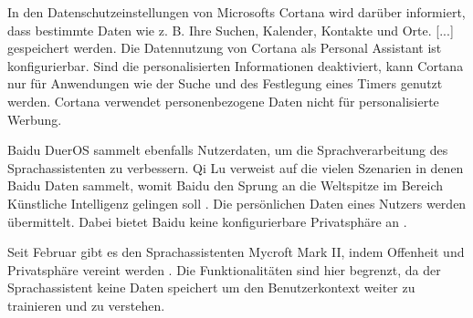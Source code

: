 In den Datenschutzeinstellungen von Microsofts Cortana wird darüber informiert, dass bestimmte Daten \glqq [...] wie z. B. Ihre Suchen, Kalender, Kontakte und Orte. [...]\grqq{}\cite{cortanaAssistent} gespeichert werden. Die Datennutzung von Cortana als Personal Assistant ist konfigurierbar. Sind die personalisierten Informationen deaktiviert, kann Cortana nur für Anwendungen wie der Suche und des Festlegung eines Timers genutzt werden. Cortana verwendet personenbezogene Daten nicht für personalisierte Werbung. 

Baidu DuerOS sammelt ebenfalls Nutzerdaten, um die Sprachverarbeitung des Sprachassistenten zu verbessern. Qi Lu verweist auf die vielen Szenarien in denen Baidu Daten sammelt, womit Baidu den Sprung an die Weltspitze im Bereich Künstliche Intelligenz gelingen soll . Die persönlichen Daten eines Nutzers werden übermittelt. Dabei bietet Baidu keine konfigurierbare Privatsphäre an \cite{baiduAI}. 

Seit Februar gibt es den Sprachassistenten Mycroft Mark II, indem Offenheit und Privatsphäre vereint werden \cite{mycroftsmartspeaker}. Die Funktionalitäten sind hier begrenzt, da der Sprachassistent keine Daten speichert um den Benutzerkontext weiter zu trainieren und zu verstehen.